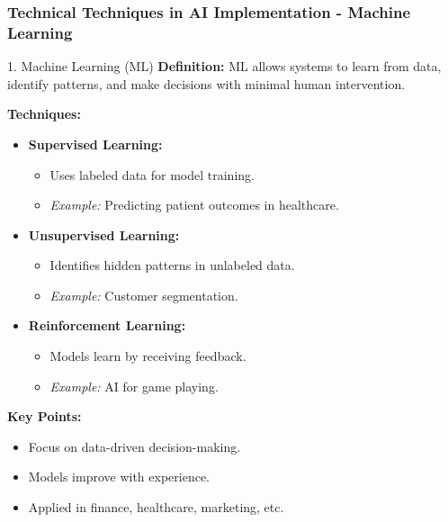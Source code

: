 \documentclass[aspectratio=169]{beamer}
\begin{document}
\begin{frame}[fragile]
    \frametitle{Technical Techniques in AI Implementation - Machine Learning}
    \begin{block}{1. Machine Learning (ML)}
        \textbf{Definition:}  
        ML allows systems to learn from data, identify patterns, and make decisions with minimal human intervention.

        \textbf{Techniques:}
        \begin{itemize}
            \item \textbf{Supervised Learning:} 
            \begin{itemize}
                \item Uses labeled data for model training.
                \item \textit{Example:} Predicting patient outcomes in healthcare.
            \end{itemize}
            \item \textbf{Unsupervised Learning:} 
            \begin{itemize}
                \item Identifies hidden patterns in unlabeled data.
                \item \textit{Example:} Customer segmentation.
            \end{itemize}
            \item \textbf{Reinforcement Learning:} 
            \begin{itemize}
                \item Models learn by receiving feedback.
                \item \textit{Example:} AI for game playing.
            \end{itemize}
        \end{itemize}

        \textbf{Key Points:}
        \begin{itemize}
            \item Focus on data-driven decision-making.
            \item Models improve with experience.
            \item Applied in finance, healthcare, marketing, etc.
        \end{itemize}
    \end{block}
\end{frame}
\end{document}
